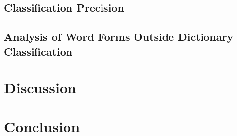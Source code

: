 \documentclass[a4paper,12pt]{article}
\begin{document}
\subsection{Classification Precision}


\subsection{Analysis of Word Forms Outside Dictionary Classification}


\section{Discussion}


\section{Conclusion}





\end{document}
